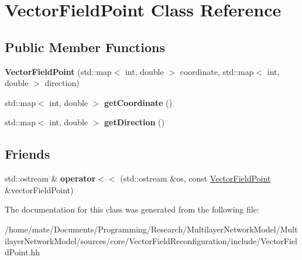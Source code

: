 \hypertarget{classVectorFieldPoint}{}\section{Vector\+Field\+Point Class Reference}
\label{classVectorFieldPoint}
\subsection*{Public Member Functions}
\begin{DoxyCompactItemize}
\item 
{\bfseries Vector\+Field\+Point} (std\+::map$<$ int, double $>$ coordinate, std\+::map$<$ int, double $>$ direction)\hypertarget{classVectorFieldPoint_aaf7f444221b412f58e3066fb359f6ced}{}\label{classVectorFieldPoint_aaf7f444221b412f58e3066fb359f6ced}

\item 
std\+::map$<$ int, double $>$ {\bfseries get\+Coordinate} ()\hypertarget{classVectorFieldPoint_aaac572daff42e5aa46d92ffc2f681095}{}\label{classVectorFieldPoint_aaac572daff42e5aa46d92ffc2f681095}

\item 
std\+::map$<$ int, double $>$ {\bfseries get\+Direction} ()\hypertarget{classVectorFieldPoint_a185b994999d47371fad7e8156e211f28}{}\label{classVectorFieldPoint_a185b994999d47371fad7e8156e211f28}

\end{DoxyCompactItemize}
\subsection*{Friends}
\begin{DoxyCompactItemize}
\item 
std\+::ostream \& {\bfseries operator$<$$<$} (std\+::ostream \&os, const \hyperlink{classVectorFieldPoint}{Vector\+Field\+Point} \&vector\+Field\+Point)\hypertarget{classVectorFieldPoint_a0acdca72efec81baafb8b278ed2a545f}{}\label{classVectorFieldPoint_a0acdca72efec81baafb8b278ed2a545f}

\end{DoxyCompactItemize}


The documentation for this class was generated from the following file\+:\begin{DoxyCompactItemize}
\item 
/home/mate/\+Documents/\+Programming/\+Research/\+Multilayer\+Network\+Model/\+Multilayer\+Network\+Model/sources/core/\+Vector\+Field\+Reconfiguration/include/Vector\+Field\+Point.\+hh\end{DoxyCompactItemize}
